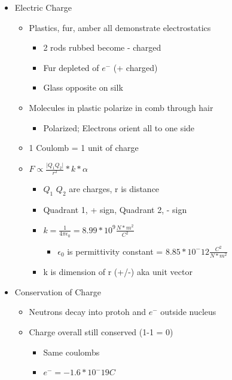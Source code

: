 \begin{itemize}
  \item Electric Charge
  \begin{itemize}
    \item Plastics, fur, amber all demonstrate electrostatics
    \begin{itemize}
      \item 2 rods rubbed become - charged
      \item Fur depleted of $e^-$ (+ charged)
      \item Glass opposite on silk
    \end{itemize}
    \item Molecules in plastic polarize in comb through hair
    \begin{itemize}
      \item Polarized; Electrons orient all to one side
    \end{itemize}
    \item 1 Coulomb = 1 unit of charge
    \item $F \propto \frac{\lvert Q_1 Q_2 \rvert}{r^2} * k * \alpha$
    \begin{itemize}
      \item $Q_1$ $Q_2$ are charges, r is distance
      \item Quadrant 1, + sign, Quadrant 2, - sign
      \item $k = \frac{1}{4 \pi \epsilon _0 } = 8.99*10^9 \frac{N*m^2}{C^2}$
      \begin{itemize}
        \item $\epsilon _0$ is permittivity constant = $8.85*10^-12 \frac{C^2}{N*m^2}$
      \end{itemize}
      \item k is dimension of r (+/-) aka unit vector 
    \end{itemize}
  \end{itemize}
  \item Conservation of Charge
  \begin{itemize}
    \item Neutrons decay into protoh and $e^-$ outside nucleus
    \item Charge overall still conserved (1-1 = 0)
    \begin{itemize}
      \item Same coulombs
      \item $e^- = -1.6*10^-19 C$
    \end{itemize}
  \end{itemize}

\end{itemize}
